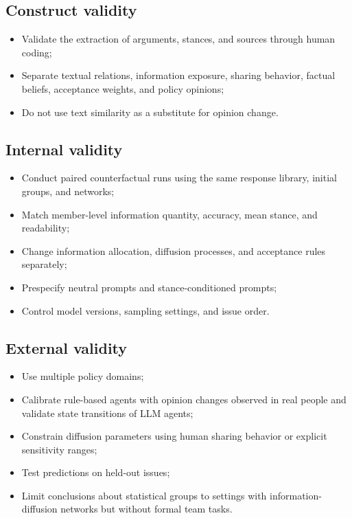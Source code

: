 \documentclass[11pt,a4paper]{article}
\begin{document}
\subsection{Construct validity}

\begin{itemize}
\item Validate the extraction of arguments, stances, and sources through human coding;
\item Separate textual relations, information exposure, sharing behavior, factual beliefs, acceptance weights, and policy opinions;
\item Do not use text similarity as a substitute for opinion change.
\end{itemize}

\subsection{Internal validity}

\begin{itemize}
\item Conduct paired counterfactual runs using the same response library, initial groups, and networks;
\item Match member-level information quantity, accuracy, mean stance, and readability;
\item Change information allocation, diffusion processes, and acceptance rules separately;
\item Prespecify neutral prompts and stance-conditioned prompts;
\item Control model versions, sampling settings, and issue order.
\end{itemize}

\subsection{External validity}

\begin{itemize}
\item Use multiple policy domains;
\item Calibrate rule-based agents with opinion changes observed in real people and validate state transitions of LLM agents;
\item Constrain diffusion parameters using human sharing behavior or explicit sensitivity ranges;
\item Test predictions on held-out issues;
\item Limit conclusions about statistical groups to settings with information-diffusion networks but without formal team tasks.
\end{itemize}
\end{document}
